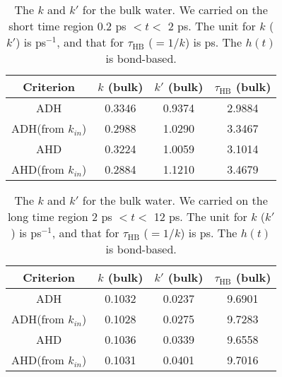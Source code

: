 %
\begin{table}[htbp]
\centering
\caption{\label{tab:k_k_prime_128w_1} 
    The $k$ and $k'$ for the bulk water. We carried on the short time region 0.2 ps $< t <$ 2 ps. 
The unit for $k$ ($k'$) is ps$^{-1}$, and that for $\tau_{\text{HB}}$ ($=1/k$) is ps. The $h(t)$ is bond-based.} 
\begin{tabular}{cccc}
 Criterion & $k$  (bulk) & $k'$ (bulk) & $\tau_{\text{HB}}$ (bulk) \\
\hline
  ADH & 0.3346 & 0.9374 & 2.9884  \\
  ADH(from $k_{in}$) & 0.2988  & 1.0290 & 3.3467   \\
  AHD & 0.3224 & 1.0059 & 3.1014 \\ 
  AHD(from $k_{in}$) & 0.2884 & 1.1210 & 3.4679 \\ 
\end{tabular}
\end{table}
%
\begin{table}[htbp]
\centering
\caption{\label{tab:k_k_prime_128w_2} 
    The $k$ and $k'$ for the bulk water. We carried on the long time region 2 ps $< t <$ 12 ps. 
The unit for $k$ ($k'$) is ps$^{-1}$, and that for $\tau_{\text{HB}}$ ($=1/k$) is ps. The $h(t)$ is bond-based.} 
\begin{tabular}{cccc}
 Criterion & $k$  (bulk) & $k'$ (bulk) & $\tau_{\text{HB}}$ (bulk) \\
\hline
  ADH & 0.1032 & 0.0237 & 9.6901 \\
  ADH(from $k_{in}$) & 0.1028  & 0.0275 & 9.7283 \\
  AHD & 0.1036 & 0.0339 & 9.6558  \\
  AHD(from $k_{in}$) & 0.1031  & 0.0401 & 9.7016  \\
\end{tabular}
\end{table}

